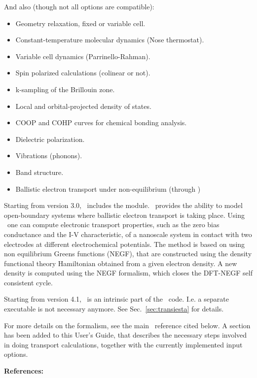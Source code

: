 And also (though not all options are compatible):
\begin{itemize}
\item Geometry relaxation, fixed or variable cell.
\item Constant-temperature molecular dynamics (Nose thermostat).
\item Variable cell dynamics (Parrinello-Rahman).
\item Spin polarized calculations (colinear or not).
\item k-sampling of the Brillouin zone.
\item Local and orbital-projected density of states.
\item COOP and COHP curves for chemical bonding analysis.
\item Dielectric polarization.
\item Vibrations (phonons).
\item Band structure.
\item Ballistic electron transport under non-equilibrium (through \tsiesta)
\end{itemize}


Starting from version 3.0, \siesta\ includes the \tsiesta{}
module. \tsiesta\ provides the ability to model open-boundary systems where ballistic
electron transport is taking place.  Using \tsiesta\ one can compute electronic
transport properties, such as the zero bias conductance and the I-V characteristic, of a
nanoscale system in contact with two electrodes at different electrochemical potentials.
The method is based on using non equilibrium Greens functions (NEGF), that are
constructed using the density functional theory Hamiltonian obtained from a given electron
density. A new density is computed using the NEGF formalism, which closes the DFT-NEGF
self consistent cycle.

Starting from version 4.1, \tsiesta\ is an intrinsic part of the
\siesta\ code. I.e. a separate executable is not necessary
anymore. See Sec.~\ref{sec:transiesta} for details.

For more details on the formalism, see the main \tsiesta\
reference cited below. A section has been added to this User's Guide,
that describes the necessary steps involved in doing transport
calculations, together with the currently implemented input options.

\vspace{0.5cm}
{\large \textbf{References:} }

